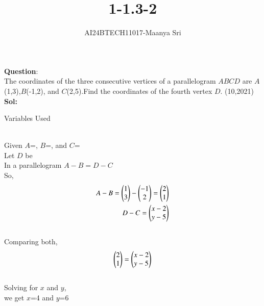\documentclass[journal]{IEEEtran}
\begin{document}

\vspace{3cm}

\title{1-1.3-2}
\author{AI24BTECH11017-Maanya Sri
}
{\let\newpage\relax\maketitle}

\renewcommand{\thefigure}{\theenumi}
\renewcommand{\thetable}{\theenumi}
\setlength{\intextsep}{10pt} %


\renewcommand{\thetable}{\theenumi}
\textbf{Question}:\\
The coordinates of the three consecutive vertices of a parallelogram $ABCD$ are $A$ (1,3),$B$(-1,2), and $C$(2,5).Find the coordinates of the fourth vertex $D$.
\hfill(10,2021)
\\ \textbf{Sol:}
\begin{table}[h!]
	\centering
	
	\caption{Variables Used}
	\label{tab1.3.2.1}
\end{table}
\\ Given $A$=,
$B$=, and
$C$=
\\ Let $D$ be 
\\ In a parallelogram $A-B = D-C$
\\ So, 
\begin{align}
A-B=\begin{pmatrix}
1
\\
3
\end{pmatrix} - \begin{pmatrix}
-1
\\
2
\end{pmatrix}=\begin{pmatrix}
2
\\
1
\end{pmatrix}
\\ D-C=\begin{pmatrix}
x-2
\\
y-5
\end{pmatrix}
\end{align}
\\Comparing both,
\begin{align}
\begin{pmatrix}
2
\\
1
\end{pmatrix} = \begin{pmatrix}
x-2
\\
y-5
\end{pmatrix}
\end{align}
\\ Solving for $x$ and $y$,
\\ we get $x$=4 and $y$=6
\end{document}

